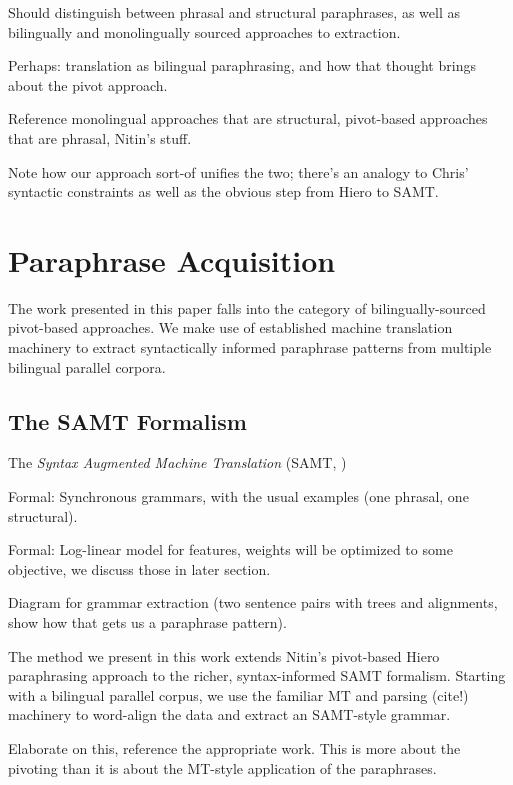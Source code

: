 \documentclass[11pt]{article}
\begin{document}
Should distinguish between phrasal and structural paraphrases, as well
as bilingually and monolingually sourced approaches to extraction.

Perhaps: translation as bilingual paraphrasing, and how that thought
brings about the pivot approach.

Reference monolingual approaches that are structural, pivot-based
approaches that are phrasal, Nitin's stuff.

Note how our approach sort-of unifies the two; there's an analogy to
Chris' syntactic constraints as well as the obvious step from Hiero to
SAMT.

\newpage

\section{Paraphrase Acquisition} \label{acquisition}

The work presented in this paper falls into the category of
bilingually-sourced pivot-based approaches. We make use of established
machine translation machinery to extract syntactically informed
paraphrase patterns from multiple bilingual parallel corpora.


\subsection{The SAMT Formalism}

The \emph{Syntax Augmented Machine Translation} (SAMT,
\cite{Zollmann2006})

Formal: Synchronous grammars, with the usual examples (one phrasal, one
structural).

Formal: Log-linear model for features, weights will be optimized to some
objective, we discuss those in later section.

Diagram for grammar extraction (two sentence pairs with trees and
alignments, show how that gets us a paraphrase pattern). 



The method we present in this work extends Nitin's pivot-based Hiero
paraphrasing approach to the richer, syntax-informed SAMT
formalism. Starting with a bilingual parallel corpus, we use the
familiar MT and parsing (cite!) machinery to word-align the data and
extract an SAMT-style grammar.

Elaborate on this, reference the appropriate work. This is more about
the pivoting than it is about the MT-style application of the
paraphrases.
\end{document}
